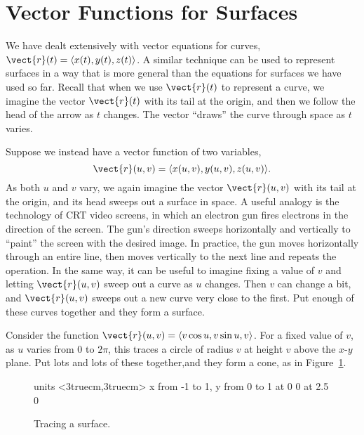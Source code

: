\section{Vector Functions for Surfaces}\label{sec:VectorFunctionSurfaces}

We have dealt extensively with vector equations for curves, 
$\vect{r}(t)=\langle x(t),y(t),z(t)\rangle$. A similar technique
can be used to represent surfaces in a way that is more general than
the equations for surfaces we have used so far. Recall that
when we use $\vect{r}(t)$ to represent a curve, we imagine the vector 
$\vect{r}(t)$ with its tail at the origin, and then we follow the head
of the arrow as $t$ changes. The vector ``draws'' the curve through
space as $t$ varies.

Suppose we instead have a vector function of two variables,
$$\vect{r}(u,v)=\langle x(u,v),y(u,v),z(u,v)\rangle.$$
As both $u$ and
$v$ vary, we again imagine the vector $\vect{r}(u,v)$ with its tail at
the origin, and its head sweeps out a surface in space. A useful
analogy is the technology of CRT video screens, in which an electron
gun fires electrons in the direction of the screen. The gun's
direction sweeps horizontally and vertically to ``paint'' the screen
with the desired image. In practice, the gun moves horizontally
through an entire line, then moves vertically to the next line and
repeats the operation. In the same way, it can be useful to imagine
fixing a value of $v$ and letting $\vect{r}(u,v)$ sweep out a curve as
$u$ changes. Then $v$ can change a bit, and $\vect{r}(u,v)$ sweeps out
a new curve very close to the first. Put enough of these curves
together and they form a surface.

\begin{example}{}{}
Consider the function $\vect{r}(u,v)=\langle v\cos u,v\sin u,
v\rangle$. For a fixed value of $v$, as $u$ varies from 0 to $2\pi$,
this traces a circle of radius $v$ at height $v$ above the
$x$-$y$ plane. Put lots and lots of these together,and they form a
cone, as in Figure~\ref{fig:parametric cone}.
\end{example}

\begin{figure}[H]
\centerline{
\vbox{\beginpicture
\normalgraphs
\setcoordinatesystem units <3truecm,3truecm>
\setplotarea x from -1 to 1, y from 0 to 1
 at 0 0
 at 2.5 0
\endpicture}}
\caption{Tracing a surface. \label{fig:parametric cone}}
\end{figure}


